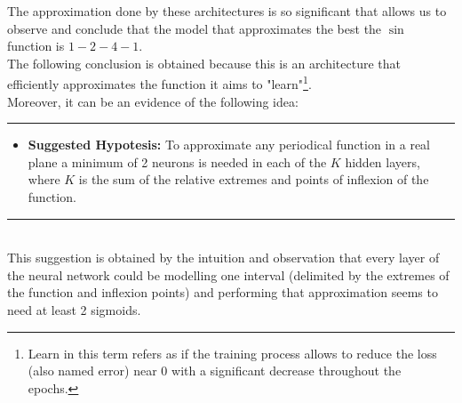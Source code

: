 \documentclass[a4paper, 11pt]{article}
\begin{document}
The approximation done by these architectures is so significant that allows us to observe and conclude that the model that approximates the best the $\sin$ function is $1-2-4-1$.\\
\newpage
\hspace{-1.6em}The following conclusion is obtained because this is an architecture that efficiently approximates the function it aims to "learn"\footnote{Learn in this term refers as if the training process allows to reduce the loss (also named error) near 0 with a significant decrease throughout the epochs.}.\\
Moreover, it can be an evidence of the following idea:\\
\rule{\linewidth}{0.4pt}
\begin{itemize}
    \item \textbf{Suggested Hypotesis:} To approximate any periodical function in a real plane a minimum of 2 neurons is needed in each of the $K$ hidden layers, where $K$ is the sum of the relative extremes and points of inflexion of the function.
\end{itemize}
\rule{\linewidth}{0.4pt}\\ \vspace{0.5em}
This suggestion is obtained by the intuition and observation that every layer of the neural network could be modelling one interval (delimited by the extremes of the function and inflexion points) and performing that approximation seems to need at least 2 sigmoids.
\end{document}

